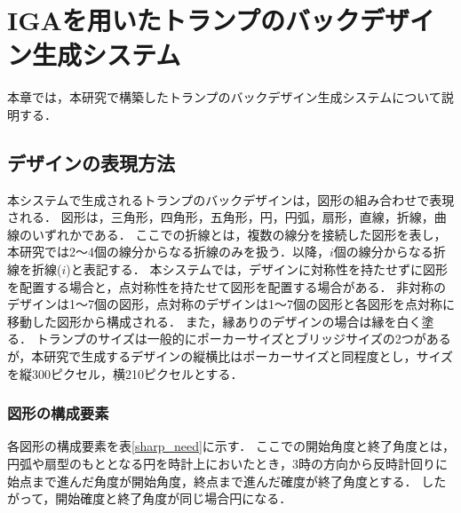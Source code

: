 \chapter{IGAを用いたトランプのバックデザイン生成システム}
本章では，本研究で構築したトランプのバックデザイン生成システムについて説明する．

\section{デザインの表現方法}
本システムで生成されるトランプのバックデザインは，図形の組み合わせで表現される．
図形は，三角形，四角形，五角形，円，円弧，扇形，直線，折線，曲線のいずれかである．
ここでの折線とは，複数の線分を接続した図形を表し，
本研究では2～4個の線分からなる折線のみを扱う．以降，$i$個の線分からなる折線を折線($i$)と表記する．
本システムでは，デザインに対称性を持たせずに図形を配置する場合と，点対称性を持たせて図形を配置する場合がある．
非対称のデザインは1～7個の図形，点対称のデザインは1～7個の図形と各図形を点対称に移動した図形から構成される．
また，縁ありのデザインの場合は縁を白く塗る．
トランプのサイズは一般的にポーカーサイズとブリッジサイズの2つがあるが，本研究で生成するデザインの縦横比はポーカーサイズと同程度とし，サイズを縦300ピクセル，横210ピクセルとする．

\subsection{図形の構成要素}
各図形の構成要素を表\ref{sharp_need}に示す．
ここでの開始角度と終了角度とは，円弧や扇型のもととなる円を時計上においたとき，3時の方向から反時計回りに始点まで進んだ角度が開始角度，終点まで進んだ確度が終了角度とする．
したがって，開始確度と終了角度が同じ場合円になる．


